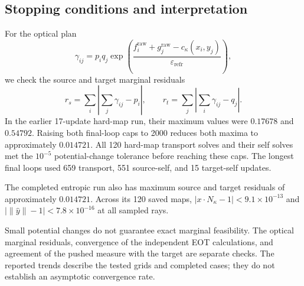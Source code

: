 \subsection{Stopping conditions and interpretation}

For the optical plan
\[
 \gamma_{ij}=p_iq_j\exp\!\left(
 \frac{f_i^{\mathrm{raw}}+g_j^{\mathrm{raw}}-c_\kappa(x_i,y_j)}
 {\varepsilon_{\mathrm{refr}}}\right),
\]
we check the source and target marginal residuals
\[
 r_s=\sum_i\left|\sum_j\gamma_{ij}-p_i\right|,\qquad
 r_t=\sum_j\left|\sum_i\gamma_{ij}-q_j\right|.
\]
In the earlier 17-update hard-map run, their maximum values were
$0.17678$ and $0.54792$. Raising both final-loop caps to 2000 reduces
both maxima to approximately $0.014721$. All 120 hard-map transport
solves and their self solves met the $10^{-5}$ potential-change tolerance
before reaching these caps. The longest final loops used 659 transport,
551 source-self, and 15 target-self updates.

The completed entropic run also has maximum source and target residuals of
approximately $0.014721$. Across its 120 saved maps,
$|x\cdot N_\kappa-1|<9.1\times10^{-13}$ and
$|\|\widehat y\|-1|<7.8\times10^{-16}$ at all sampled rays.

Small potential changes do not guarantee exact marginal feasibility.
The optical marginal residuals, convergence of the independent EOT
calculations, and agreement of the pushed measure with the target are
separate checks. The reported trends describe the tested grids and
completed cases; they do not establish an asymptotic convergence rate.
\clearpage








